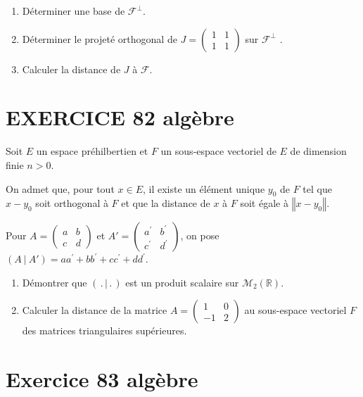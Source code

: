 \documentclass[10pt,oneside]{article}
\begin{document}
\begin{flushleft}
\begin{enumerate}
\item D\'{e}terminer une base de $\mathcal{F}^{\perp }$.

\item D\'{e}terminer le projeté orthogonal de $J=\left( 
\begin{array}{cc}
1 & 1 \\ 
1 & 1%
\end{array}%
\right)$ sur $\mathcal{F}^{\perp }$ .
\item
Calculer la distance de $J$ à $\mathcal{F}$.
\end{enumerate}


\section*{EXERCICE 82 \: algèbre}

Soit $E$ un espace pr\'{e}hilbertien et $F$ un sous-espace vectoriel de $E$ de dimension finie $n>0$.\smallskip

On admet que, pour tout $x\in E$, il existe un élément unique $y_0$ de $F$ tel que $x-y_0$ soit orthogonal à $F$ et que la distance de $x$ à $F$ soit égale à  $\left\Vert x-y_0\right\Vert$.

Pour $A=\begin{pmatrix}
a & b \\ 
c & d%
\end{pmatrix}$ et $A'=\begin{pmatrix}
a^{\prime } & b^{\prime } \\ 
c^{\prime } & d^{\prime }%
\end{pmatrix}$,  on pose $\left(  A\ |\ A'\right) =aa^{\prime}+bb^{\prime}+cc^{\prime}+dd^{\prime}$.

\begin{enumerate}
\item Démontrer que  $\left( \,.\,|\,.\,\right) $ est un produit scalaire sur $\mathcal{M}_{2}\left( \mathbb{R}\right)$.

\item Calculer la distance de la matrice $A=\left( 
\begin{array}{cc}
1 & 0 \\ 
-1 & 2%
\end{array}%
\right)$ au sous-espace vectoriel $F$ des matrices triangulaires sup\'{e}rieures.
\end{enumerate}


\section*{Exercice 83 \: algèbre}




\end{flushleft}
\end{document}
